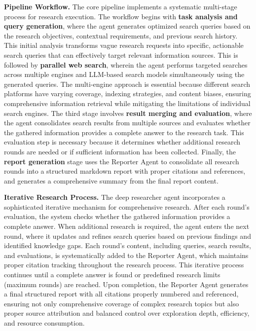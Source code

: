 \documentclass[11pt]{article}
\begin{document}
\textbf{Pipeline Workflow.} The core pipeline implements a systematic multi-stage process for research execution. The workflow begins with \textbf{task analysis and query generation}, where the agent generates optimized search queries based on the research objectives, contextual requirements, and previous search history. This initial analysis transforms vague research requests into specific, actionable search queries that can effectively target relevant information sources. This is followed by \textbf{parallel web search}, wherein the agent performs targeted searches across multiple engines and LLM-based search models simultaneously using the generated queries. The multi-engine approach is essential because different search platforms have varying coverage, indexing strategies, and content biases, ensuring comprehensive information retrieval while mitigating the limitations of individual search engines. The third stage involves \textbf{result merging and evaluation}, where the agent consolidates search results from multiple sources and evaluates whether the gathered information provides a complete answer to the research task. This evaluation step is necessary because it determines whether additional research rounds are needed or if sufficient information has been collected. Finally, the \textbf{report generation} stage uses the Reporter Agent to consolidate all research rounds into a structured markdown report with proper citations and references, and generates a comprehensive summary from the final report content.

\textbf{Iterative Research Process.} The deep researcher agent incorporates a sophisticated iterative mechanism for comprehensive research. After each round's evaluation, the system checks whether the gathered information provides a complete answer. When additional research is required, the agent enters the next round, where it updates and refines search queries based on previous findings and identified knowledge gaps. Each round's content, including queries, search results, and evaluations, is systematically added to the Reporter Agent, which maintains proper citation tracking throughout the research process. This iterative process continues until a complete answer is found or predefined research limits (maximum rounds) are reached. Upon completion, the Reporter Agent generates a final structured report with all citations properly numbered and referenced, ensuring not only comprehensive coverage of complex research topics but also proper source attribution and balanced control over exploration depth, efficiency, and resource consumption.
\end{document}
